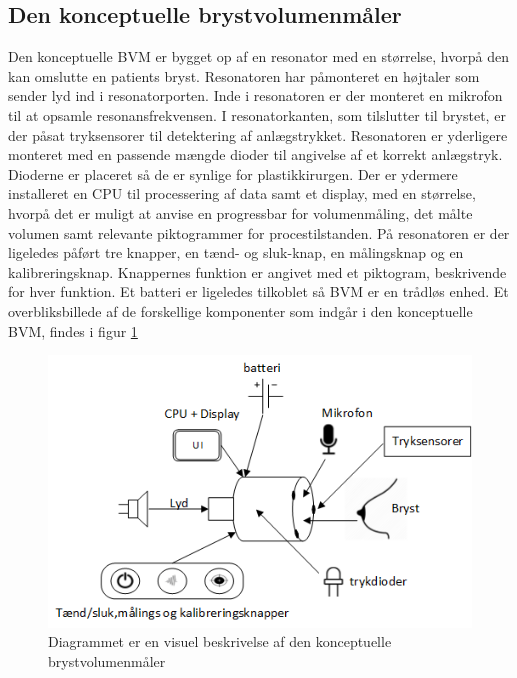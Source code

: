 		\subsection{Den konceptuelle brystvolumenmåler} \label{subsec:BVMopb}
		
		Den konceptuelle BVM er bygget op af en resonator med en størrelse, hvorpå den kan omslutte en patients bryst. Resonatoren har påmonteret en højtaler som sender lyd ind i resonatorporten. Inde i resonatoren er der monteret en mikrofon til at opsamle resonansfrekvensen. I resonatorkanten, som tilslutter til brystet, er der påsat tryksensorer til detektering af anlægstrykket. Resonatoren er yderligere monteret med en passende mængde dioder til angivelse af et korrekt anlægstryk. Dioderne er placeret så de er synlige for plastikkirurgen. Der er ydermere installeret en CPU til processering af data samt et display, med en størrelse, hvorpå det er muligt at anvise en progressbar for volumenmåling, det målte volumen samt relevante piktogrammer for procestilstanden. På resonatoren er der ligeledes påført tre knapper, en tænd- og sluk-knap, en målingsknap og en kalibreringsknap. Knappernes funktion er angivet med et piktogram, beskrivende for hver funktion. Et batteri er ligeledes tilkoblet så BVM er en trådløs enhed. Et overbliksbillede af de forskellige komponenter som indgår i den konceptuelle BVM, findes i figur \ref{fig:ksys} 
		
\vspace{5mm}  
		
		\begin{figure}[htb]
			\centering
				\includegraphics[width=5in]{Ksys.png}
				\caption{Diagrammet er en visuel beskrivelse af den konceptuelle brystvolumenmåler}	
				\label{fig:ksys}
			\end{figure}	     
		

